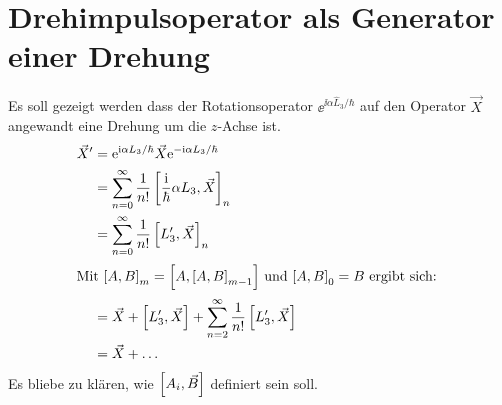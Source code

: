 \section{Drehimpulsoperator als Generator einer Drehung}

Es soll gezeigt werden dass der Rotationsoperator $\ee^{\ii\alpha\hat L_3 / \hbar}$ auf den Operator $\vec X$ angewandt eine Drehung um die $z$-Achse ist.
\begin{align*}
 \vec X' &= \ee^{\ii\alpha L_3 /\hbar} \vec X \ee^{-\ii\alpha L_3 /\hbar}\\
 &= \sum_{n=0}^\infty \frac1{n!} \sbr{\frac{\ii}{\hbar} \alpha L_3, \vec X}_n\\
 &= \sum_{n=0}^\infty \frac1{n!} \sbr{L'_3, \vec X}_n\\
 \intertext{%
  Mit $\sbr{A,B}_m = \sbr{A, \sbr{A,B}_{m-1}}$ und $\sbr{A,B}_0 = B$ ergibt sich:
  }
 &= \vec X + \sbr{L'_3, \vec X} + \sum_{n=2}^\infty \frac1{n!} \sbr{L'_3, \vec X}\\
 &= \vec X + \ldots
\end{align*}
Es bliebe zu klären, wie $\sbr{A_i,\vec B}$ definiert sein soll.



